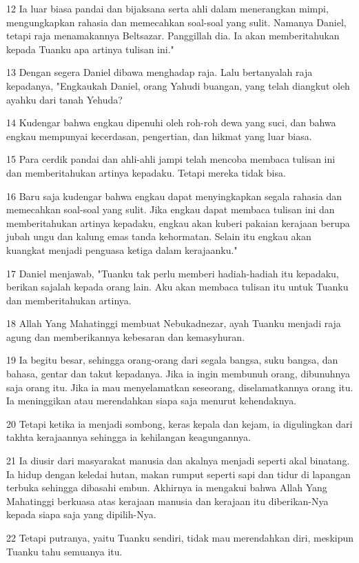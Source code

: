 \par 12 Ia luar biasa pandai dan bijaksana serta ahli dalam menerangkan mimpi, mengungkapkan rahasia dan memecahkan soal-soal yang sulit. Namanya Daniel, tetapi raja menamakannya Beltsazar. Panggillah dia. Ia akan memberitahukan kepada Tuanku apa artinya tulisan ini."
\par 13 Dengan segera Daniel dibawa menghadap raja. Lalu bertanyalah raja kepadanya, "Engkaukah Daniel, orang Yahudi buangan, yang telah diangkut oleh ayahku dari tanah Yehuda?
\par 14 Kudengar bahwa engkau dipenuhi oleh roh-roh dewa yang suci, dan bahwa engkau mempunyai kecerdasan, pengertian, dan hikmat yang luar biasa.
\par 15 Para cerdik pandai dan ahli-ahli jampi telah mencoba membaca tulisan ini dan memberitahukan artinya kepadaku. Tetapi mereka tidak bisa.
\par 16 Baru saja kudengar bahwa engkau dapat menyingkapkan segala rahasia dan memecahkan soal-soal yang sulit. Jika engkau dapat membaca tulisan ini dan memberitahukan artinya kepadaku, engkau akan kuberi pakaian kerajaan berupa jubah ungu dan kalung emas tanda kehormatan. Selain itu engkau akan kuangkat menjadi penguasa ketiga dalam kerajaanku."
\par 17 Daniel menjawab, "Tuanku tak perlu memberi hadiah-hadiah itu kepadaku, berikan sajalah kepada orang lain. Aku akan membaca tulisan itu untuk Tuanku dan memberitahukan artinya.
\par 18 Allah Yang Mahatinggi membuat Nebukadnezar, ayah Tuanku menjadi raja agung dan memberikannya kebesaran dan kemasyhuran.
\par 19 Ia begitu besar, sehingga orang-orang dari segala bangsa, suku bangsa, dan bahasa, gentar dan takut kepadanya. Jika ia ingin membunuh orang, dibunuhnya saja orang itu. Jika ia mau menyelamatkan seseorang, diselamatkannya orang itu. Ia meninggikan atau merendahkan siapa saja menurut kehendaknya.
\par 20 Tetapi ketika ia menjadi sombong, keras kepala dan kejam, ia digulingkan dari takhta kerajaannya sehingga ia kehilangan keagungannya.
\par 21 Ia diusir dari masyarakat manusia dan akalnya menjadi seperti akal binatang. Ia hidup dengan keledai hutan, makan rumput seperti sapi dan tidur di lapangan terbuka sehingga dibasahi embun. Akhirnya ia mengakui bahwa Allah Yang Mahatinggi berkuasa atas kerajaan manusia dan kerajaan itu diberikan-Nya kepada siapa saja yang dipilih-Nya.
\par 22 Tetapi putranya, yaitu Tuanku sendiri, tidak mau merendahkan diri, meskipun Tuanku tahu semuanya itu.
